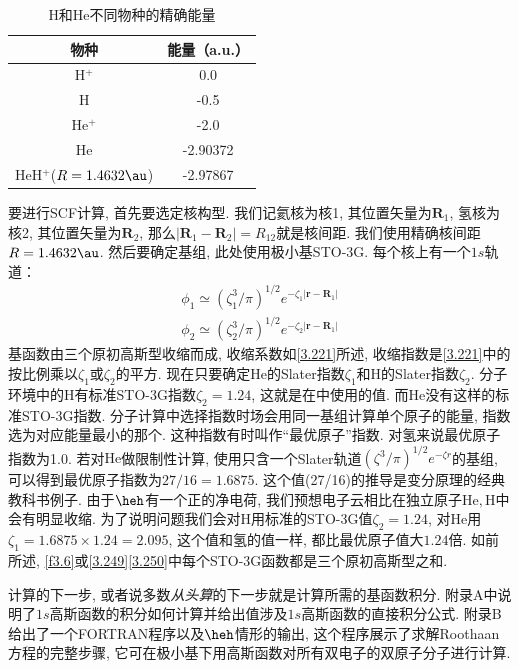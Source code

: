 \begin{table}[H]
	\centering
	\caption{H和He不同物种的精确能量}
	\begin{tabular}{cc}
		\hline
		物种 & 能量（a.u.）\\\hline
		H$^+$      & 0.0\\
		H     & -0.5\\
		He$^+$     & -2.0\\
		He     & -2.90372\\
		HeH$^+$($R = 1.4632\au$)&-2.97867\\\hline
	\end{tabular}
	\label{t3.4}
\end{table}
要进行SCF计算, 首先要选定核构型. 
我们记氦核为核1, 其位置矢量为$\mathbf{R}_1$, 
氢核为核2, 其位置矢量为$\mathbf{R}_2$, 
那么$|\mathbf{R}_1-\mathbf{R}_2|=R_{12}$就是核间距. 
我们使用精确核间距$R=1.4632\au$. 
然后要确定基组, 此处使用极小基STO-3G. 
每个核上有一个$1s$轨道：
\begin{align}
	\label{3.249}
	\phi_1 \simeq (\zeta_1^3/\pi)^{1/2} e^{-\zeta_1|\mathbf{r-R}_1|}\\
	\label{3.250}
	\phi_2 \simeq (\zeta_2^3/\pi)^{1/2} e^{-\zeta_2|\mathbf{r-R}_1|}
\end{align}
基函数由三个原初高斯型收缩而成, 
收缩系数如\autoref{3.221}所述, 
收缩指数是\autoref{3.221}中的按比例乘以$\zeta_1$或$\zeta_2$的平方. 
现在只要确定$\mathrm{He}$的Slater指数$\zeta_1$和$\mathrm{H}$的Slater指数$\zeta_2$. 
分子环境中的$\mathrm{H}$有标准STO-3G指数$\zeta_2=1.24$, 
这就是在中使用的值. 
而$\mathrm{He}$没有这样的标准STO-3G指数. 
分子计算中选择指数时场会用同一基组计算单个原子的能量, 
指数选为对应能量最小的那个. 
这种指数有时叫作``最优原子''指数. 
对氢来说最优原子指数为1.0. 
若对$\mathrm{He}$做限制性\hft 计算, 
使用只含一个Slater轨道$(\zeta^3/\pi)^{1/2}e^{-\zeta r}$的基组, 
可以得到最优原子指数为$27/16=1.6875$. 
这个值(27/16)的推导是变分原理的经典教科书例子.
由于$\heh$有一个正的净电荷, 
我们预想电子云相比在独立原子$\mathrm{He,H}$中会有明显收缩. 
为了说明问题我们会对$\mathrm{H}$用标准的STO-3G值$\zeta_2=1.24$, 
对$\mathrm{He}$用$\zeta_1=1.6875\times 1.24=2.095$, 
这个值和氢的值一样, 
都比最优原子值大$1.24$倍. 
如前所述, 
\autoref{f3.6}或\autoref{3.249}\autoref{3.250}中每个STO-3G函数都是三个原初高斯型之和.


计算的下一步, 
或者说多数\emph{从头算}的下一步就是计算所需的基函数积分. 
附录A中说明了$1s$高斯函数的积分如何计算并给出值涉及$1s$高斯函数的直接积分公式. 
附录B给出了一个FORTRAN程序以及$\heh$情形的输出, 
这个程序展示了求解Roothaan方程的完整步骤, 
它可在极小基下用高斯函数对所有双电子的双原子分子进行计算. 

